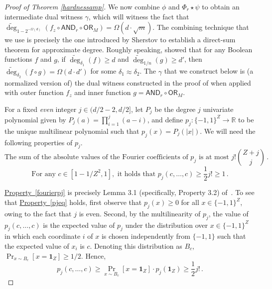 \documentclass[11pt]{article}
\numberwithin{equation}{section}
\theoremstyle{definition}
\theoremstyle{plain}
\newcommand{\R}{\mathbb R}
\newcommand{\expeqref}[2]{\hyperref[#2]{#1~\eqref{#2}}}
\newcommand{\OR}{\mathsf{ OR}}
\newcommand{\bits}{\{-1,1\}}
\newcommand{\ls}{\star}
\newcommand{\adeg}{\widetilde{\operatorname{deg}}}
\newcommand{\AND}{\mathsf{AND}}
\begin{document}
\begin{proof}[Proof of Theorem \ref{hardnessamp}]
	We now combine $\phi$ and $\Phi_r \ls \psi$ to obtain an intermediate dual witness $\gamma$, 
	which will witness the fact that $\adeg_{1-2^{-\Omega(d)}}(f_z \circ \AND_r \circ \OR_M) = \Omega(d \cdot \sqrt{m})$.
	The combining technique that we use is precisely the one introduced by Sherstov \cite[Theorem 6.1]{sherstovdp} 
	to establish a direct-sum theorem for approximate degree. Roughly speaking, \cite[Theorem 6.1]{sherstovdp}
	showed that for any Boolean functions $f$ and $g$, if $\adeg_{\delta_1}(f) \geq d$ and $\adeg_{1/n}(g) \geq d'$, then $\adeg_{\delta_2}(f \circ g) = \Omega(d \cdot d')$
	for some $\delta_1 \approx \delta_2$. The $\gamma$ that we construct below is 
	(a normalized version of) the dual witness constructed in the proof of \cite[Theorem 6.1]{sherstovdp} when
	applied with outer function $f_z$ and inner function $g=\AND_r \circ \OR_M$. 
	
	For a fixed \emph{even} integer $j \in (d/2-2, d/2]$, let $P_j$ be the degree $j$ univariate polynomial given by $P_j(a) = \prod_{i=1}^j (a-i)$,
	and define $p_j \colon \bits^{Z} \to \R$ to
	be the unique multilinear polynomial such that $p_j(x)= P_j(|x|)$. 
	We will need the following properties of $p_j$.
	\begin{equation}
	\label{fourierpj} 
	\text{The sum of the absolute values of the Fourier coefficients of } p_j \text{ is at most } j! {Z + j \choose j}\,.
	\end{equation}
	\begin{equation} \label{pjeq}
	\text{For any } c \in [1-1/Z^2, 1], \text{ it holds that } p_j(c, \dots, c) \geq \frac{1}{2}  j! \geq 1\,.
	\end{equation}
	
	\expeqref{Property}{fourierpj} is precisely Lemma 3.1 (specifically, Property 3.2) of~\cite{sherstovdp}.
	To see that \expeqref{Property}{pjeq} holds, first observe that $p_j(x) \geq 0$ for all $x \in \bits^{Z}$,
	owing to the fact that $j$ is even. Second, by the multilinearity of $p_j$, the value of $p_j(c, \dots, c)$ is the expected
	value of $p_j$ under the distribution over $x \in \bits^{Z}$ in which each coordinate $i$ of $x$ is chosen independently
	from $\{-1, 1\}$ such that the expected value of $x_i$ is $c$. Denoting this distribution as $B_c$, $\Pr_{x \sim B_c}[x = \mathbf{1}_{Z}] \geq 1/2$.
Hence, %
\begin{equation}
 p_j(c, \dots, c) \geq \Pr_{x \sim B_c}[x = \mathbf{1}_{Z}] \cdot p_j(\mathbf{1}_{Z}) \geq \frac12  j!\,.
\end{equation}	
	\medskip
	 

\end{proof}
\end{document}
